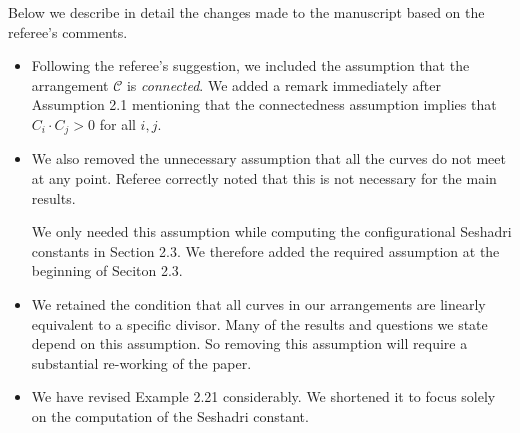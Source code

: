 \documentclass[12pt,twoside,reqno]{amsart}
\numberwithin{equation}{section}
\theoremstyle{definition}
\begin{document}
Below we describe in detail the changes made to the manuscript based on the referee's comments. 
\begin{itemize}
\item Following the referee's suggestion, we included the assumption that the arrangement $\mathcal{C}$ is \textit{connected}. We added a remark immediately after Assumption 2.1 mentioning that the connectedness assumption implies that $C_i \cdot C_j > 0$ for all $i,j$.

\item We also removed the unnecessary assumption that all the curves do not meet at any point. Referee correctly noted that this is not necessary for the main results. 

We only needed this assumption while computing the configurational Seshadri constants in Section 2.3. We therefore added the required assumption at the beginning of Seciton 2.3. 

\item We retained the condition that all curves in our arrangements are linearly equivalent to a specific divisor. Many of the results and questions we state depend on this assumption. So removing this assumption will require a substantial re-working of the paper. 


\item We have revised Example 2.21 considerably. We shortened it to focus solely on the computation of the Seshadri constant.
\end{itemize}


\end{document}
